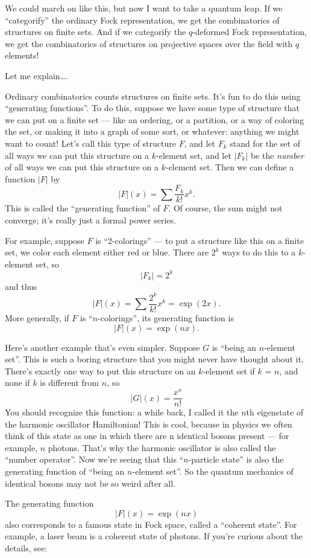 \documentclass{article}
\begin{document}
We could march on like this, but now I want to take a quantum leap. If
we ``categorify'' the ordinary Fock representation, we get the
combinatorics of structures on finite sets. And if we categorify the
\(q\)-deformed Fock representation, we get the combinatorics of
structures on projective spaces over the field with \(q\) elements!

Let me explain\ldots.

Ordinary combinatorics counts structures on finite sets. It's fun to do
this using ``generating functions''. To do this, suppose we have some
type of structure that we can put on a finite set --- like an ordering,
or a partition, or a way of coloring the set, or making it into a graph
of some sort, or whatever: anything we might want to count! Let's call
this type of structure \(F\), and let \(F_k\) stand for the set of all
ways we can put this structure on a \(k\)-element set, and let \(|F_k|\)
be the \emph{number} of all ways we can put this structure on a
\(k\)-element set. Then we can define a function \(|F|\) by
\[|F|(x) = \sum\frac{F_k}{k!}x^k.\] This is called the ``generating
function'' of \(F\). Of course, the sum might not converge; it's really
just a formal power series.

For example, suppose \(F\) is ``2-colorings'' --- to put a structure
like this on a finite set, we color each element either red or blue.
There are \(2^k\) ways to do this to a \(k\)-element set, so
\[|F_k| = 2^k\] and thus \[|F|(x) = \sum\frac{2^k}{k!}x^k = \exp(2x).\]
More generally, if \(F\) is ``\(n\)-colorings'', its generating function
is \[|F|(x) = \exp(nx).\]

Here's another example that's even simpler. Suppose \(G\) is ``being an
\(n\)-element set''. This is such a boring structure that you might
never have thought about it. There's exactly one way to put this
structure on an \(k\)-element set if \(k\) = \(n\), and none if \(k\) is
different from \(n\), so \[|G|(x) = \frac{x^n}{n!}\] You should
recognize this function: a while back, I called it the \(n\)th
eigenstate of the harmonic oscillator Hamiltonian! This is cool, because
in physics we often think of this state as one in which there are n
identical bosons present --- for example, \(n\) photons. That's why the
harmonic oscillator is also called the ``number operator''. Now we're
seeing that this ``\(n\)-particle state'' is also the generating
function of ``being an \(n\)-element set''. So the quantum mechanics of
identical bosons may not be so weird after all.

The generating function \[|F|(x) = \exp(nx)\] also corresponds to a
famous state in Fock space, called a ``coherent state''. For example, a
laser beam is a coherent state of photons. If you're curious about the
details, see:
\end{document}
